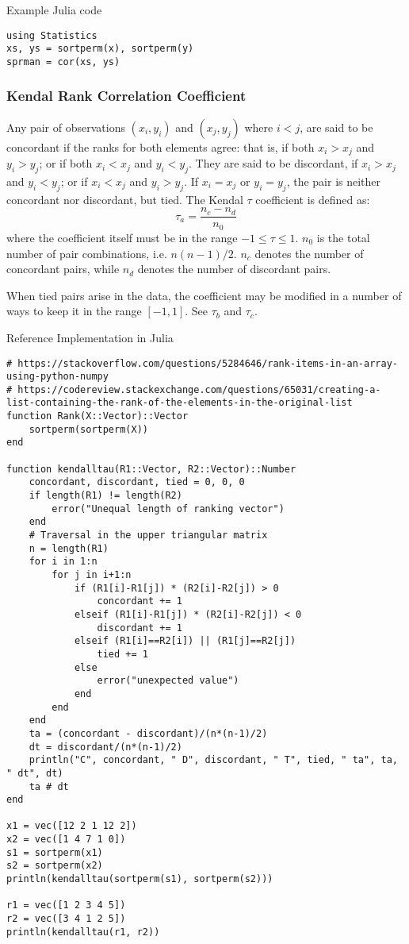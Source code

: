 Example Julia code
\begin{verbatim}
using Statistics
xs, ys = sortperm(x), sortperm(y)
sprman = cor(xs, ys)
\end{verbatim}

\subsubsection{Kendal Rank Correlation Coefficient} 

Any pair of observations $(x_i,y_i)$ and $(x_j,y_j)$ where $i<j$, are said to
be concordant if the ranks for both elements agree: that is, if both $x_i>x_j$
and $y_i>y_j$; or if both $x_i<x_j$ and $y_i<y_j$. They are said to be
discordant, if $x_i>x_j$ and $y_i<y_j$; or if $x_i<x_j$ and $y_i>y_j$. If
$x_i=x_j$ or $y_i=y_j$, the pair is neither concordant nor discordant, but
tied. The Kendal $\tau$ coefficient is defined as:
$$ \tau_a = \frac{n_c-n_d}{n_0} $$
where the coefficient itself must be in the range $-1\le \tau \le 1$.  $n_0$ is
the total number of pair combinations, i.e. $n(n-1)/2$. $n_c$ denotes the
number of concordant pairs, while $n_d$ denotes the number of discordant pairs.

When tied pairs arise in the data, the coefficient may be modified in a number
of ways to keep it in the range $[-1,1]$. See $\tau_b$ and $\tau_c$.

Reference Implementation in Julia
\begin{verbatim}
# https://stackoverflow.com/questions/5284646/rank-items-in-an-array-using-python-numpy
# https://codereview.stackexchange.com/questions/65031/creating-a-list-containing-the-rank-of-the-elements-in-the-original-list
function Rank(X::Vector)::Vector
	sortperm(sortperm(X))
end

function kendalltau(R1::Vector, R2::Vector)::Number
	concordant, discordant, tied = 0, 0, 0
	if length(R1) != length(R2)
		error("Unequal length of ranking vector")
	end
	# Traversal in the upper triangular matrix
	n = length(R1)
	for i in 1:n
		for j in i+1:n
			if (R1[i]-R1[j]) * (R2[i]-R2[j]) > 0
				concordant += 1
			elseif (R1[i]-R1[j]) * (R2[i]-R2[j]) < 0
				discordant += 1
			elseif (R1[i]==R2[i]) || (R1[j]==R2[j])
				tied += 1
			else
				error("unexpected value")
			end
		end
	end
	ta = (concordant - discordant)/(n*(n-1)/2)
	dt = discordant/(n*(n-1)/2)
	println("C", concordant, " D", discordant, " T", tied, " ta", ta, " dt", dt)
	ta # dt
end

x1 = vec([12 2 1 12 2])
x2 = vec([1 4 7 1 0])
s1 = sortperm(x1)
s2 = sortperm(x2)
println(kendalltau(sortperm(s1), sortperm(s2)))

r1 = vec([1 2 3 4 5])
r2 = vec([3 4 1 2 5])
println(kendalltau(r1, r2))
\end{verbatim}


